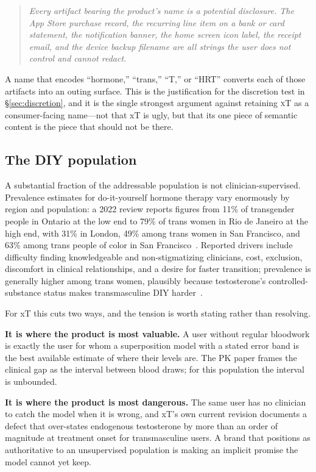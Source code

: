 \documentclass[11pt,a4paper]{article}
\newcommand{\name}[1]{\textsc{#1}}
\begin{document}
\begin{quote}
\emph{Every artifact bearing the product's name is a potential
disclosure. The App Store purchase record, the recurring line item on a
bank or card statement, the notification banner, the home screen icon
label, the receipt email, and the device backup filename are all
strings the user does not control and cannot redact.}
\end{quote}

A name that encodes ``hormone,'' ``trans,'' ``T,'' or ``HRT'' converts
each of those artifacts into an outing surface. This is the
justification for the discretion test in \S\ref{sec:discretion}, and it
is the single strongest argument against retaining \name{xT} as a
consumer-facing name---not that xT is ugly, but that its one piece of
semantic content is the piece that should not be there.

\subsection{The DIY population}
\label{sec:diy}

A substantial fraction of the addressable population is not
clinician-supervised. Prevalence estimates for do-it-yourself hormone
therapy vary enormously by region and population: a 2022 review reports
figures from 11\% of transgender people in Ontario at the low end to
79\% of trans women in Rio de Janeiro at the high end, with 31\% in
London, 49\% among trans women in San Francisco, and 63\% among trans
people of color in San Francisco~\cite{diywiki}. Reported drivers
include difficulty finding knowledgeable and non-stigmatizing
clinicians, cost, exclusion, discomfort in clinical relationships, and
a desire for faster transition; prevalence is generally higher among
trans women, plausibly because testosterone's controlled-substance
status makes transmasculine DIY harder~\cite{diywiki}.

For xT this cuts two ways, and the tension is worth stating rather than
resolving.

\textbf{It is where the product is most valuable.} A user without
regular bloodwork is exactly the user for whom a superposition model
with a stated error band is the best available estimate of where their
levels are. The PK paper frames the clinical gap as the interval
between blood draws; for this population the interval is unbounded.

\textbf{It is where the product is most dangerous.} The same user has
no clinician to catch the model when it is wrong, and xT's own current
revision documents a defect that over-states endogenous testosterone by
more than an order of magnitude at treatment onset for transmasculine
users. A brand that positions as authoritative to an unsupervised
population is making an implicit promise the model cannot yet keep.
\end{document}

